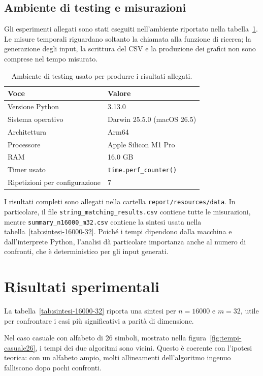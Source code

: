 \documentclass{article}
\begin{document}
\subsection{Ambiente di testing e misurazioni}
Gli esperimenti allegati sono stati eseguiti nell'ambiente riportato nella tabella~\ref{tab:ambiente}. Le misure temporali riguardano soltanto la chiamata alla funzione di ricerca; la generazione degli input, la scrittura del CSV e la produzione dei grafici non sono comprese nel tempo misurato.

\begin{table}[H]
\centering
\begin{tabular}{ll}
\toprule
Voce & Valore \\
\midrule
Versione Python & 3.13.0 \\
Sistema operativo & Darwin 25.5.0 (macOS 26.5) \\
Architettura & Arm64 \\
Processore & Apple Silicon M1 Pro \\
RAM & 16.0 GB \\
Timer usato & \texttt{time.perf\_counter()} \\
Ripetizioni per configurazione & 7 \\
\bottomrule
\end{tabular}
\caption{Ambiente di testing usato per produrre i risultati allegati.}
\label{tab:ambiente}
\end{table}

I risultati completi sono allegati nella cartella \texttt{report/resources/data}. In particolare, il file \texttt{string\_matching\_results.csv} contiene tutte le misurazioni, mentre \texttt{summary\_n16000\_m32.csv} contiene la sintesi usata nella tabella~\ref{tab:sintesi-16000-32}. Poiché i tempi dipendono dalla macchina e dall'interprete Python, l'analisi dà particolare importanza anche al numero di confronti, che è deterministico per gli input generati.

\section{Risultati sperimentali}
La tabella~\ref{tab:sintesi-16000-32} riporta una sintesi per $n=16000$ e $m=32$, utile per confrontare i casi più significativi a parità di dimensione.



Nel caso casuale con alfabeto di 26 simboli, mostrato nella figura~\ref{fig:tempi-casuale26}, i tempi dei due algoritmi sono vicini. Questo è coerente con l'ipotesi teorica: con un alfabeto ampio, molti allineamenti dell'algoritmo ingenuo falliscono dopo pochi confronti.
\end{document}
